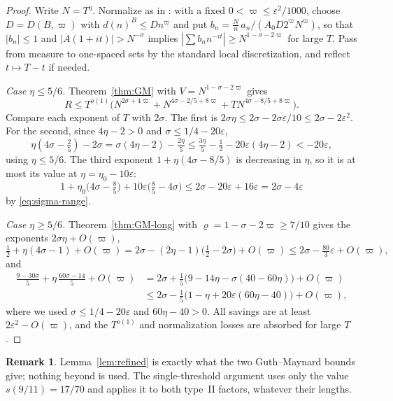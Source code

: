 \documentclass[11pt,a4paper]{amsart}
\theoremstyle{definition}
\newtheorem{remark}[theorem]{Remark}
\newcommand{\e}{\varepsilon}
\newcommand{\1}{\mathbf 1}
\begin{document}
\begin{proof}
Write \(N=T^\eta\).  Normalize as in \cite[Lemma~4.1]{MT}: with a fixed
\(0<\varpi\le\e^2/1000\), choose \(D=D(B,\varpi)\) with \(d(n)^B\le Dn^\varpi\)
and put \(b_n=\frac{N}{n}\,a_n/(A_0D2^\varpi N^\varpi)\), so that
\(|b_n|\le1\) and \(|A(1+it)|>N^{-\sigma}\) implies
\(|\sum b_nn^{-it}|\ge N^{1-\sigma-2\varpi}\) for large \(T\).  Pass from
measure to one-spaced sets by the standard local discretization, and
reflect \(t\mapsto T-t\) if needed.

\emph{Case \(\eta\le5/6\).}  Theorem~\ref{thm:GM} with
\(V=N^{1-\sigma-2\varpi}\) gives
\[
 R\le T^{o(1)}\bigl(N^{2\sigma+4\varpi}+N^{4\sigma-2/5+8\varpi}
 +TN^{4\sigma-8/5+8\varpi}\bigr).
\]
Compare each exponent of \(T\) with \(2\sigma\).  The first is
\(2\sigma\eta\le2\sigma-2\sigma\e/10\le2\sigma-2\e^2\).  For the second,
since \(4\eta-2>0\) and \(\sigma\le1/4-20\e\),
\[
 \eta(4\sigma-\tfrac25)-2\sigma=\sigma(4\eta-2)-\tfrac{2\eta}5
 \le\tfrac{3\eta}5-\tfrac12-20\e(4\eta-2)<-20\e,
\]
using \(\eta\le5/6\).  The third exponent
\(1+\eta(4\sigma-8/5)\) is decreasing in \(\eta\), so it is at most its
value at \(\eta=\eta_0-10\e\):
\[
 1+\eta_0\bigl(4\sigma-\tfrac85\bigr)+10\e\bigl(\tfrac85-4\sigma\bigr)
 \le 2\sigma-20\e+16\e=2\sigma-4\e
\]
by \eqref{eq:sigma-range}.

\emph{Case \(\eta\ge5/6\).}  Theorem~\ref{thm:GM-long} with
\(\varrho=1-\sigma-2\varpi\ge7/10\) gives the exponents
\(2\sigma\eta+O(\varpi)\),
\[
 \tfrac12+\eta(4\sigma-1)+O(\varpi)
 =2\sigma-(2\eta-1)\bigl(\tfrac12-2\sigma\bigr)+O(\varpi)
 \le2\sigma-\tfrac{80}3\e+O(\varpi),
\]
and
\begin{align*}
 \tfrac{9-30\sigma}5+\eta\,\tfrac{60\sigma-14}5+O(\varpi)
 &=2\sigma+\tfrac15\bigl(9-14\eta-\sigma(40-60\eta)\bigr)+O(\varpi)\\
 &\le2\sigma-\tfrac15\bigl(1-\eta+20\e(60\eta-40)\bigr)+O(\varpi),
\end{align*}
where we used \(\sigma\le1/4-20\e\) and \(60\eta-40>0\).  All savings
are at least \(2\e^2-O(\varpi)\), and the \(T^{o(1)}\) and normalization
losses are absorbed for large \(T\).
\end{proof}

\begin{remark}
Lemma~\ref{lem:refined} is exactly what the two Guth--Maynard bounds
give; nothing beyond \cite{GM} is used.  The single-threshold argument
uses only the value \(s(9/11)=17/70\) and applies it to both type~II
factors, whatever their lengths.
\end{remark}
\end{document}
